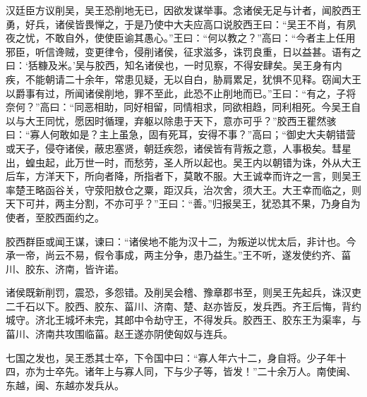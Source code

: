 \documentclass[12pt,UTF8]{ctexbook}
\begin{document}
汉廷臣方议削吴，吴王恐削地无已，因欲发谋举事。念诸侯无足与计者，闻胶西王勇，好兵，诸侯皆畏惮之，于是乃使中大夫应高口说胶西王曰：“吴王不肖，有夙夜之忧，不敢自外，使使臣谕其愚心。”王曰：“何以教之？”高曰：“今者主上任用邪臣，听信谗贼，变更律令，侵削诸侯，征求滋多，诛罚良重，日以益甚。语有之曰：‘狧糠及米。’吴与胶西，知名诸侯也，一时见察，不得安肆矣。吴王身有内疾，不能朝请二十余年，常患见疑，无以自白，胁肩累足，犹惧不见释。窃闻大王以爵事有过，所闻诸侯削地，罪不至此，此恐不止削地而已。”王曰：“有之，子将奈何？”高曰：“同恶相助，同好相留，同情相求，同欲相趋，同利相死。今吴王自以与大王同忧，愿因时循理，弃躯以除患于天下，意亦可乎？”胶西王瞿然骇曰：“寡人何敢如是？主上虽急，固有死耳，安得不事？”高曰；“御史大夫朝错营或天子，侵夺诸侯，蔽忠塞贤，朝廷疾怨，诸侯皆有背叛之意，人事极矣。彗星出，蝗虫起，此万世一时，而愁劳，圣人所以起也。吴王内以朝错为诛，外从大王后车，方洋天下，所向者降，所指者下，莫敢不服。大王诚幸而许之一言，则吴王率楚王略函谷关，守荥阳敖仓之粟，距汉兵，治次舍，须大王。大王幸而临之，则天下可并，两主分割，不亦可乎？”王曰：“善。”归报吴王，犹恐其不果，乃身自为使者，至胶西面约之。



胶西群臣或闻王谋，谏曰：“诸侯地不能为汉十二，为叛逆以忧太后，非计也。今承一帝，尚云不易，假令事成，两主分争，患乃益生。”王不听，遂发使约齐、菑川、胶东、济南，皆许诺。



诸侯既新削罚，震恐，多怨错。及削吴会稽、豫章郡书至，则吴王先起兵，诛汉吏二千石以下。胶西、胶东、菑川、济南、楚、赵亦皆反，发兵西。齐王后悔，背约城守。济北王城坏未完，其郎中令劫守王，不得发兵。胶西王、胶东王为渠率，与菑川、济南共攻围临菑。赵王遂亦阴使匈奴与连兵。



七国之发也，吴王悉其士卒，下令国中曰：“寡人年六十二，身自将。少子年十四，亦为士卒先。诸年上与寡人同，下与少子等，皆发！”二十余万人。南使闽、东越，闽、东越亦发兵从。
\end{document}
